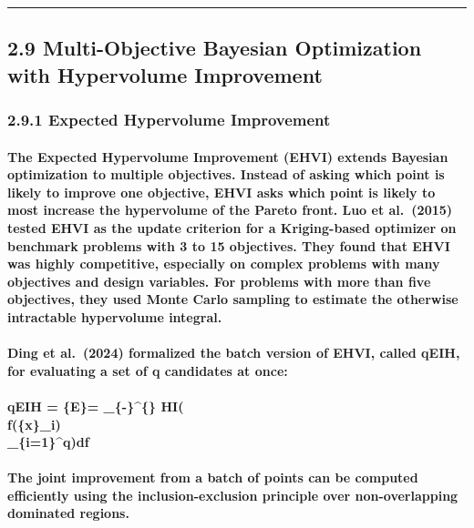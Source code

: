\begin{center}\rule{0.5\linewidth}{0.5pt}\end{center}

\subsection{2.9 Multi-Objective Bayesian Optimization with Hypervolume
Improvement}\label{multi-objective-bayesian-optimization-with-hypervolume-improvement}

\subsubsection{2.9.1 Expected Hypervolume
Improvement}\label{expected-hypervolume-improvement}

\paragraph{The Expected Hypervolume Improvement (EHVI) extends Bayesian optimization to multiple objectives. Instead of asking which point is likely to improve one objective, EHVI asks which point is likely to most increase the hypervolume of the Pareto front. Luo et al. (2015) tested EHVI as the update criterion for a Kriging-based optimizer on benchmark problems with 3 to 15 objectives. They found that EHVI was highly competitive, especially on complex problems with many objectives and design variables. For problems with more than five objectives, they used Monte Carlo sampling to estimate the otherwise intractable hypervolume integral.}

\paragraph{Ding et al. (2024) formalized the batch version of EHVI, called qEIH, for evaluating a set of q candidates at once:}

\paragraph{qEIH = \mathbb\{E\}\left[HI\left(\\{f(\mathbf\{x\}\_i)\\}\_\{i=1\}^q\right)\right] = \int\_\{-\infty\}^\{\infty\} HI\left(\\{f(\mathbf\{x\}\_i)\\}\_\{i=1\}^q\right)df}

\paragraph{The joint improvement from a batch of points can be computed efficiently using the inclusion-exclusion principle over non-overlapping dominated regions.}

